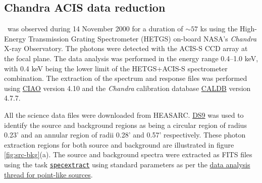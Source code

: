     
    \subsection{Chandra ACIS data reduction}
    	\source\ was observed during 14 November 2000 for a duration of $\sim 57$ ks using the High-Energy Transmission Grating Spectrometer (HETGS) on-board NASA's \textit{Chandra} X-ray Observatory. %
    	The photons were detected with the ACIS-S CCD array at the focal plane. The data analysis was performed in the energy range 0.4--1.0 keV, with 0.4 keV being the lower limit of the HETGS+ACIS-S spectrometer combination. The extraction of the spectrum and response files was performed using \href{https://cxc.cfa.harvard.edu/ciao/}{CIAO} version 4.10 and the \textit{Chandra} calibration database \href{https://cxc.cfa.harvard.edu/caldb/}{CALDB} version 4.7.7.
    	
    	All the science data files were downloaded from HEASARC. \href{https://sites.google.com/cfa.harvard.edu/saoimageds9}{DS9} was used to identify the source and background regions as being a circular region of radius 0.23' and an annular region of radii 0.28' and 0.57' respectively. These photon extraction regions for both source and background are illustrated in figure \ref{fig:src-bkg}(a). The source and background spectra were extracted as FITS files using the task %
    	\href{https://cxc.cfa.harvard.edu/ciao/ahelp/specextract.html}{\texttt{specextract}} using standard parameters as per the %
    	\href{https://cxc.cfa.harvard.edu/ciao/threads/pointlike/}{data analysis thread for point-like sources}. %
    	
